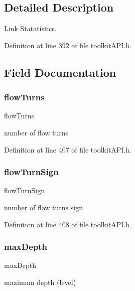 \subsection{Detailed Description}
Link Statatistics. 

Definition at line 392 of file toolkit\+A\+P\+I.\+h.



\subsection{Field Documentation}
\mbox{\label{struct_s_m___link_stats_ada1865c586b1e17558bc5f77a182fec8}} 
\subsubsection{\texorpdfstring{flowTurns}{flowTurns}}
{\footnotesize\ttfamily flow\+Turns}

number of flow turns 

Definition at line 407 of file toolkit\+A\+P\+I.\+h.

\mbox{\label{struct_s_m___link_stats_adcf8d5ec953a621ed93aac9c501142c2}} 
\subsubsection{\texorpdfstring{flowTurnSign}{flowTurnSign}}
{\footnotesize\ttfamily flow\+Turn\+Sign}

number of flow turns sign 

Definition at line 408 of file toolkit\+A\+P\+I.\+h.

\mbox{\label{struct_s_m___link_stats_a7228dabd4235761cf24edaa63c29ac5e}} 
\subsubsection{\texorpdfstring{maxDepth}{maxDepth}}
{\footnotesize\ttfamily max\+Depth}

maximum depth (level) 

